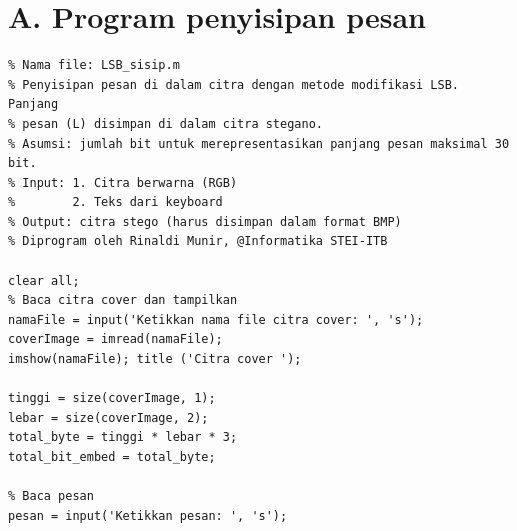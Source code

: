 \documentclass{article}
\begin{document}

\section*{A. Program penyisipan pesan}

\begin{verbatim}
% Nama file: LSB_sisip.m
% Penyisipan pesan di dalam citra dengan metode modifikasi LSB. Panjang
% pesan (L) disimpan di dalam citra stegano.
% Asumsi: jumlah bit untuk merepresentasikan panjang pesan maksimal 30 bit.
% Input: 1. Citra berwarna (RGB)
%        2. Teks dari keyboard
% Output: citra stego (harus disimpan dalam format BMP)
% Diprogram oleh Rinaldi Munir, @Informatika STEI-ITB

clear all;
% Baca citra cover dan tampilkan
namaFile = input('Ketikkan nama file citra cover: ', 's');
coverImage = imread(namaFile);
imshow(namaFile); title ('Citra cover ');

tinggi = size(coverImage, 1);
lebar = size(coverImage, 2);
total_byte = tinggi * lebar * 3;
total_bit_embed = total_byte;

% Baca pesan
pesan = input('Ketikkan pesan: ', 's');
\end{verbatim}
\end{document}
